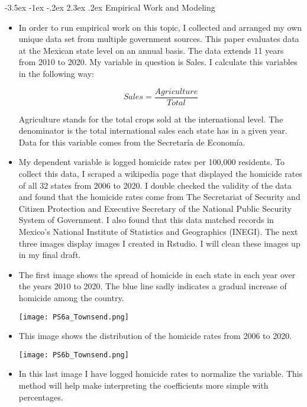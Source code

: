 \documentclass[12pt]{article}
\makeatletter
\renewcommand\section{\@startsection {section}{1}{\z@}%
                                       {-3.5ex \@plus -1ex \@minus -.2ex}%
                                       {2.3ex \@plus.2ex}%
                                       {\normalfont\fontfamily{phv}\fontsize{16}{19}\bfseries}}
\makeatother
\begin{document}
\section{Empirical Work and Modeling} \label{s:sec4}
\begin{itemize}
    \item In order to run empirical work on this topic, I collected and arranged my own unique data set from multiple government sources. This paper evaluates data at the Mexican state level on an annual basis. The data extends 11 years from 2010 to 2020. My variable in question is Sales. I calculate this variables in the following way:
    
    $$Sales=\frac{Agriculture}{Total}$$
    
    Agriculture stands for the total crops sold at the international level. The denominator is the total international sales each state has in a given year. Data for this variable comes from the Secretaría de Economía.
    
    \item My dependent variable is logged homicide rates per 100,000 residents. To collect this data, I scraped a wikipedia page that displayed the homicide rates of all 32 states from 2006 to 2020. I double checked the validity of the data and found that the homicide rates come from The Secretariat of Security and Citizen Protection and Executive Secretary of the National Public Security System of Government. I also found that this data matched records in Mexico's National Institute of Statistics and Geographics (INEGI). The next three images display images I created in Rstudio. I will clean these images up in my final draft. 
    
    \item The first image shows the spread of homicide in each state in each year over the years 2010 to 2020. The blue line sadly indicates a gradual increase of homicide among the country.
    
    \texttt{[image: PS6a\_Townsend.png]}
    
    \item This image shows the distribution of the homicide rates from 2006 to 2020.
    
    \texttt{[image: PS6b\_Townsend.png]}
    
    \item In this last image I have logged homicide rates to normalize the variable. This method will help make interpreting the coefficients more simple with percentages.
    

\end{itemize}
\end{document}
